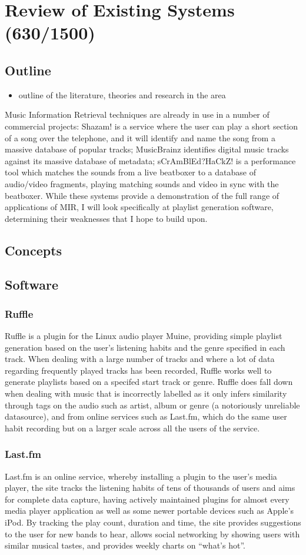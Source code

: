 \chapter{Review of Existing Systems (630/1500)}
\section{Outline}
\begin{itemize}
	\item outline of the literature, theories and research in the area
\end{itemize}
Music Information Retrieval techniques are already in use in a number of commercial projects: Shazam! is a service where the user can play a short section of a song over the telephone, and it will identify and name the song from a massive database of popular tracks; MusicBrainz identifies digital music tracks against its massive database of metadata; sCrAmBlEd?HaCkZ! is a performance tool which matches the sounds from a live beatboxer to a database of audio/video fragments, playing matching sounds and video in sync with the beatboxer. While these systems provide a demonstration of the full range of applications of MIR, I will look specifically at playlist generation software, determining their weaknesses that I hope to build upon.
\section{Concepts}
\section{Software}
\subsection{Ruffle}
Ruffle is a plugin for the Linux audio player Muine, providing simple playlist generation based on the user's listening habits and the genre specified in each track. When dealing with a large number of tracks and where a lot of data regarding frequently played tracks has been recorded, Ruffle works well to generate playlists based on a specifed start track or genre. Ruffle does fall down when dealing with music that is incorrectly labelled as it only infers similarity through tags on the audio such as artist, album or genre (a notoriously unreliable datasource), and from online services such as Last.fm, which do the same user habit recording but on a larger scale across all the users of the service.
\subsection{Last.fm}
Last.fm is an online service, whereby installing a plugin to the user's media player, the site tracks the listening habits of tens of thousands of users and aims for complete data capture, having actively maintained plugins for almost every media player application as well as some newer portable devices such as Apple's iPod. By tracking the play count, duration and time, the site provides suggestions to the user for new bands to hear, allows social networking by showing users with similar musical tastes, and provides weekly charts on ``what's hot''.
